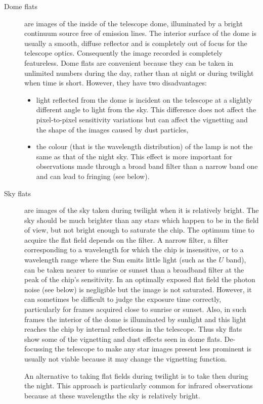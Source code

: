 \documentclass[twoside,11pt]{starlink}
\begin{document}
\begin{description}

  \item[Dome flats] are images of the inside of the telescope dome,
   illuminated by a bright continuum source free of emission lines.
   The interior surface of the dome is usually a smooth, diffuse
   reflector and is completely out of focus for the telescope optics.
   Consequently the image recorded is completely featureless.  Dome flats are
   convenient because they can be taken in unlimited numbers during the
   day, rather than at night or during twilight when time is short.
   However, they have two disadvantages:

  \begin{itemize}

    \item light reflected from the dome is incident on the telescope at
     a slightly different angle to light from the sky.  This difference
     does not affect the pixel-to-pixel sensitivity variations but can
     affect the vignetting and the shape of the images caused by dust
     particles,

    \item the colour (that is the wavelength distribution) of the lamp
     is not the same as that of the night sky.  This effect is more
     important for observations made through a broad band filter than
     a narrow band one and can lead to fringing (see below).

  \end{itemize}

  \item[Sky flats] are images of the sky taken during twilight when
   it is relatively bright.  The sky should be much brighter than any
   stars which happen to be in the field of view, but not bright enough
   to saturate the chip.  The optimum time to acquire the flat field
   depends on the filter.  A narrow filter, a filter corresponding to a
   wavelength for which the chip is insensitive, or to a wavelength range
   where the Sun emits little light (such as the  $U$ band), can be taken
   nearer to sunrise or sunset than a broadband filter at the peak of the
   chip's sensitivity.  In an optimally exposed flat field the photon
   noise (see below) is negligible but the image is not saturated.
   However, it can sometimes be difficult to judge the exposure time
   correctly, particularly for frames acquired close to sunrise or sunset.
   Also, in such frames the interior of the dome is illuminated by
   sunlight and this light reaches the chip by internal reflections in the
   telescope.  Thus sky flats show some of the vignetting and dust effects
   seen in dome flats.  De-focussing the telescope to make any star images
   present less prominent is usually not viable because it may change
   the vignetting function.

   An alternative to taking flat fields during twilight is to take then
   during the night.  This approach is particularly common for infrared
   observations because at these wavelengths the sky is relatively bright.

\end{description}
\end{document}
